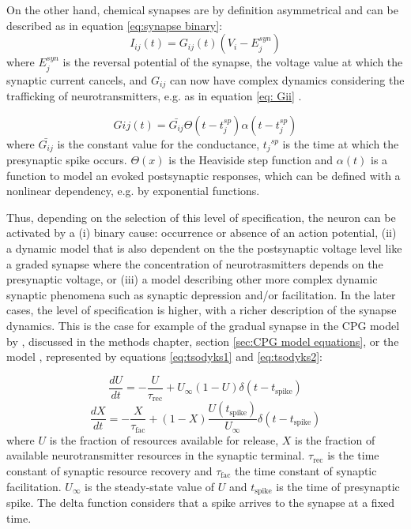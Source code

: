On the other hand, chemical synapses are by definition asymmetrical and can be described as in equation \ref{eq:synapse binary}:
\begin{equation}
     I_{ij}(t) = G_{ij}(t) (V_i - E_j^{syn})
     \label{eq:synapse binary}
\end{equation}
\noindent where $E_j^{syn}$ is the reversal potential of the synapse, the voltage value at which the synaptic current cancels, and $G_{ij}$ can now have complex dynamics considering the trafficking of neurotransmitters, e.g. as in equation \ref{eq: Gii} \parencite{torres_modeling_2012}. 

\begin{equation}
	G{ij}(t) = \bar{G_{ij}}  \Theta(t-t_j^{sp}) \alpha (t-t_j^{sp})
	\label{eq: Gii}
\end{equation}
\noindent where $\bar{G_{ij}}$ is the constant value for the conductance, ${t_j}^{sp}$ is the time at which the presynaptic spike occurs. $\Theta(x)$ is the Heaviside step function and $\alpha(t)$ is a function to model an evoked postsynaptic responses, which can be defined with a nonlinear dependency, e.g. by exponential functions.

Thus, depending on the selection of this level of specification, the neuron can be activated by a (i) binary cause: occurrence or absence of an action potential, (ii) a dynamic model that is also dependent on the the postsynaptic voltage level like a graded synapse where the concentration of neurotrasmitters depends on the presynaptic voltage, or (iii) a model describing  other more complex dynamic synaptic phenomena such as synaptic depression and/or facilitation. In the later cases, the level of specification is higher, with a richer description of the synapse dynamics. This is the case for example of the gradual synapse in the CPG model by \textcite{vavoulis_dynamic_2007}, discussed in the methods chapter, section \ref{sec:CPG model equations}, or the \textcite{tsodyks_neural_1997} model , represented by equations \ref{eq:tsodyks1} and \ref{eq:tsodyks2}:


\begin{equation}
	\frac{dU}{dt} = -\frac{U}{\tau_{\text{rec}}} + U_{\infty}(1 - U) \delta(t - t_{\text{spike}})
	\label{eq:tsodyks1}
\end{equation}
\begin{equation}
	\frac{dX}{dt} = -\frac{X}{\tau_{\text{fac}}} + (1 - X) \frac{U(t_{\text{spike}})}{U_{\infty}} \delta(t - t_{\text{spike}})
	\label{eq:tsodyks2}
\end{equation}
\noindent where $U$ is the fraction of resources available for release, $X$ is the fraction of available neurotransmitter resources in the synaptic terminal. $\tau_\text{rec}$ is the time constant of synaptic resource recovery and $\tau_\text{fac}$ the time constant of synaptic facilitation. $U_\infty$ is the steady-state value of $U$ and $t_{\text{spike}}$ is the time of presynaptic spike. The delta function considers that a spike arrives to the synapse at a fixed time. 


